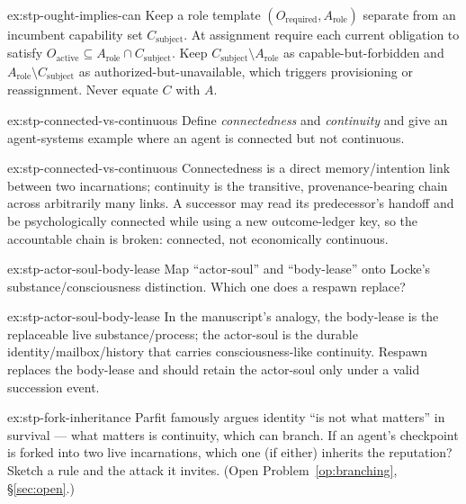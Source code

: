 \documentclass[11pt,a4paper]{article}
\theoremstyle{definition}
\begin{document}
\begin{pdsolution}{ex:stp-ought-implies-can}
Keep a role template $(O_{\text{required}}, A_{\text{role}})$ separate from an
incumbent capability set $C_{\text{subject}}$. At assignment require each
current obligation to satisfy
$O_{\text{active}} \subseteq A_{\text{role}} \cap C_{\text{subject}}$. Keep
$C_{\text{subject}} \setminus A_{\text{role}}$ as capable-but-forbidden and
$A_{\text{role}} \setminus C_{\text{subject}}$ as authorized-but-unavailable,
which triggers provisioning or reassignment. Never equate $C$ with $A$.
\end{pdsolution}


\begin{pdexercise}[kind=Check,rating=1]{ex:stp-connected-vs-continuous}
Define \emph{connectedness} and \emph{continuity} and give an agent-systems
example where an agent is connected but not continuous.
\end{pdexercise}
\begin{pdsolution}{ex:stp-connected-vs-continuous}
Connectedness is a direct memory/intention link between two incarnations;
continuity is the transitive, provenance-bearing chain across arbitrarily many
links. A successor may read its predecessor's handoff and be psychologically
connected while using a new outcome-ledger key, so the accountable chain is
broken: connected, not economically continuous.
\end{pdsolution}
\begin{pdexercise}[kind=Trace,rating=2]{ex:stp-actor-soul-body-lease}
Map ``actor-soul'' and ``body-lease'' onto Locke's substance/consciousness
distinction. Which one does a respawn replace?
\end{pdexercise}
\begin{pdsolution}{ex:stp-actor-soul-body-lease}
In the manuscript's analogy, the body-lease is the replaceable live
substance/process; the actor-soul is the durable identity/mailbox/history that
carries consciousness-like continuity. Respawn replaces the body-lease and
should retain the actor-soul only under a valid succession event.
\end{pdsolution}
\begin{pdexercise}[kind=Open,rating=3]{ex:stp-fork-inheritance}
Parfit famously argues identity ``is not what matters'' in survival --- what
matters is continuity, which can branch. If an agent's checkpoint is forked
into two live incarnations, which one (if either) inherits the reputation?
Sketch a rule and the attack it invites. (Open Problem~\ref{op:branching},
\S\ref{sec:open}.)
\end{pdexercise}
\end{document}
